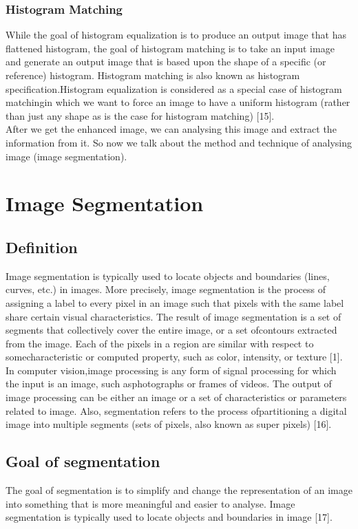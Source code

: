 \subsubsection{Histogram Matching}
While the goal of histogram equalization is to produce an output image that has flattened histogram, the goal
of histogram matching is to take an input image and generate an output image that is based upon the shape of a
specific (or reference) histogram. Histogram matching is also known as histogram specification.Histogram equalization
is considered as a special case of histogram matchingin which we want to force an image to have a uniform histogram
(rather than just any shape as is the case for histogram matching) [15].\\
After we get the enhanced image, we can analysing this image and extract the information from it. So now we talk
about the method and technique of analysing image (image segmentation).

\section{Image Segmentation}
\subsection{Definition}
Image segmentation is typically used to locate objects and boundaries (lines, curves, etc.) in images.
More precisely, image segmentation is the process of assigning a label to every pixel in an image such
that pixels with the same label share certain visual characteristics. The result of image segmentation is
a set of segments that collectively cover the entire image, or a set ofcontours extracted from the image.
Each of the pixels in a region are similar with respect to somecharacteristic or computed property,
such as color, intensity, or texture [1].\\
In computer vision,image processing is any form of signal processing for which the input is an image,
such asphotographs or frames of videos. The output of image processing can be either an image or a set
of characteristics or parameters related to image. Also, segmentation refers to the process ofpartitioning
a digital image into multiple segments (sets of pixels, also known as super pixels) [16].
\subsection{Goal of segmentation}
The goal of segmentation is to simplify and change the representation of an image into something that is
more meaningful and easier to analyse. Image segmentation is typically used to locate objects and boundaries in image [17].
